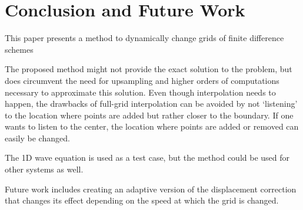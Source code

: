 \section{Conclusion and Future Work}
This paper presents a method to dynamically change grids of finite difference schemes


The proposed method might not provide the exact solution to the problem, but does circumvent the need for upsampling and higher orders of computations necessary to approximate this solution. Even though interpolation needs to happen, the drawbacks of full-grid interpolation can be avoided by not `listening' to the location where points are added but rather closer to the boundary. If one wants to listen to the center, the location where points are added or removed can easily be changed.

The 1D wave equation is used as a test case, but the method could be used for other systems as well. 


Future work includes creating an adaptive version of the displacement correction that changes its effect depending on the speed at which the grid is changed.

